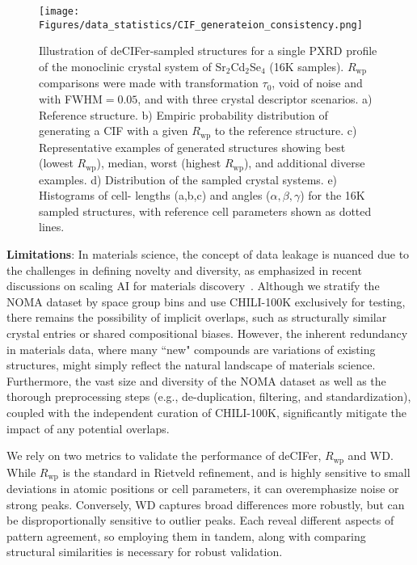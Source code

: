 \begin{figure}[ht!]
\begin{center}
\centerline{\texttt{[image: Figures/data\_statistics/CIF\_generateion\_consistency.png]}}
\vspace{-0.3cm}
\caption{Illustration of deCIFer-sampled structures for a single PXRD profile of the monoclinic crystal system of Sr$_2$Cd$_2$Se$_4$ (16K samples). $R_{\mathrm{wp}}$ comparisons were made with transformation $\tau_0$, void of noise and with FWHM$=0.05$, and with three crystal descriptor scenarios. a) Reference structure. b) Empiric probability distribution of generating a CIF with a given $R_{\mathrm{wp}}$ to the reference structure. c) Representative examples of generated structures showing best (lowest $R_{\mathrm{wp}}$), median, worst (highest $R_{\mathrm{wp}}$), and additional diverse examples. d) Distribution of the sampled crystal systems. e) Histograms of cell- lengths (a,b,c) and angles ($\alpha, \beta, \gamma$) for the 16K sampled structures, with reference cell parameters shown as dotted lines.}
\label{fig:self_consistency}
\end{center}
\vspace{-0.65cm}
\end{figure}

{\bf Limitations}: 
In materials science, the concept of data leakage is nuanced due to the challenges in defining novelty and diversity, as emphasized in recent discussions on scaling AI for materials discovery~\cite{cheetham2024ai_materials_discovery}. Although we stratify the NOMA dataset by space group bins and use CHILI-100K exclusively for testing, there remains the possibility of implicit overlaps, such as structurally similar crystal entries or shared compositional biases. However, the inherent redundancy in materials data, where many ``new" compounds are variations of existing structures, might simply reflect the natural landscape of materials science. Furthermore, the vast size and diversity of the NOMA dataset as well as the thorough preprocessing steps (e.g., de-duplication, filtering, and standardization), coupled with the independent curation of CHILI-100K, significantly mitigate the impact of any potential overlaps. 

We rely on two metrics to validate the performance of deCIFer, $R_{\mathrm{wp}}$ and WD. While $R_{\mathrm{wp}}$ is the standard in Rietveld refinement, and is highly sensitive to small deviations in atomic positions or cell parameters, it can overemphasize noise or strong peaks. Conversely, WD captures broad differences more robustly, but can be disproportionally sensitive to outlier peaks. Each reveal different aspects of pattern agreement, so employing them in tandem, along with comparing structural similarities is necessary for robust validation.

